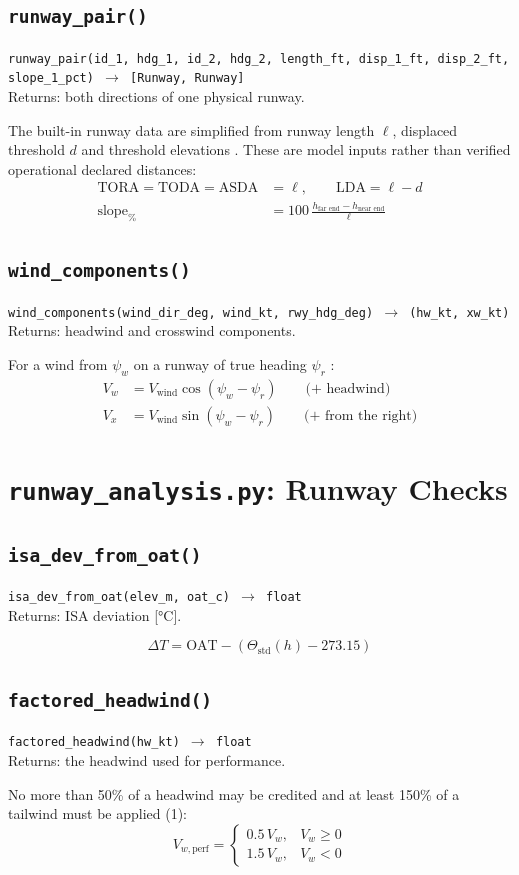 \documentclass[11pt,letterpaper]{article}
\numberwithin{equation}{section}
\newcommand{\func}[2]{\begin{funcbox}\texttt{#1}\\[2pt]{\color{ink3}Returns:} #2\end{funcbox}}
\newcommand{\code}[1]{\textmd{\texttt{#1}}}
\begin{document}
\subsection{\code{runway\_pair()}}
\func{runway\_pair(id\_1, hdg\_1, id\_2, hdg\_2, length\_ft, disp\_1\_ft, disp\_2\_ft, slope\_1\_pct) $\rightarrow$ [Runway, Runway]}{both directions of one physical runway.}
The built-in runway data are simplified from runway length $\ell$, displaced threshold $d$ and threshold elevations \cite{OURAIRPORTS}. These are model inputs rather than verified operational declared distances:
\begin{align}
\text{TORA} = \text{TODA} = \text{ASDA} &= \ell, \qquad \text{LDA} = \ell - d \label{eq:lda}\\
\text{slope}_\% &= 100\,\frac{h_\text{far end} - h_\text{near end}}{\ell} \label{eq:slope-rwy}
\end{align}

\subsection{\code{wind\_components()}}
\func{wind\_components(wind\_dir\_deg, wind\_kt, rwy\_hdg\_deg) $\rightarrow$ (hw\_kt, xw\_kt)}{headwind and crosswind components.}
For a wind from $\psi_w$ on a runway of true heading $\psi_r$ \cite{AIRBUS-GTG}:
\begin{align}
V_w &= V_\text{wind}\cos(\psi_w - \psi_r) \qquad \text{(+ headwind)} \label{eq:wind-hw}\\
V_x &= V_\text{wind}\sin(\psi_w - \psi_r) \qquad \text{(+ from the right)} \label{eq:wind-xw}
\end{align}

\section{\code{runway\_analysis.py}: Runway Checks}\label{sec:runway}
\subsection{\code{isa\_dev\_from\_oat()}}
\func{isa\_dev\_from\_oat(elev\_m, oat\_c) $\rightarrow$ float}{ISA deviation [\si{\celsius}].}
\begin{equation}
\Delta T = \text{OAT} - \left(\Theta_\text{std}(h) - 273.15\right) \label{eq:isa-dev}
\end{equation}

\subsection{\code{factored\_headwind()}}
\func{factored\_headwind(hw\_kt) $\rightarrow$ float}{the headwind used for performance.}
No more than 50\% of a headwind may be credited and at least 150\% of a tailwind must be applied \cite[\S25.105(d)]{14CFR25}(1):
\begin{equation}
V_{w,\text{perf}} =
\begin{cases}
0.5\,V_w, & V_w \ge 0\\
1.5\,V_w, & V_w < 0
\end{cases} \label{eq:wind-perf}
\end{equation}
\end{document}
